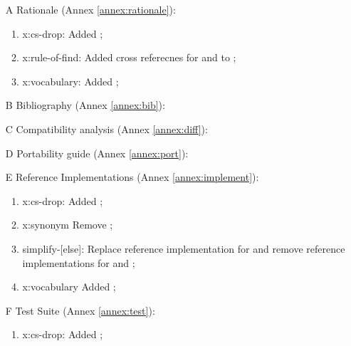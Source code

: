 \begin{itemize}
	\item[A] Rationale (Annex \ref{annex:rationale}):	%
		\begin{enumerate}
		\item \textsf{x:cs-drop}: Added ;
		\item \textsf{x:rule-of-find}: Added cross referecnes for
			 and  to
			;
		\item \textsf{x:vocabulary}: Added ;
		\end{enumerate}
	\item[B] Bibliography (Annex \ref{annex:bib}):		%
	\item[C] Compatibility analysis (Annex \ref{annex:diff}):	%
	\item[D] Portability guide (Annex \ref{annex:port}):		%
	\item[E] Reference Implementations (Annex \ref{annex:implement}): %
		\begin{enumerate}
		\item \textsf{x:cs-drop}: Added ;
		\item \textsf{x:synonym} Remove ; %
		\item \textsf{simplify-[else]}: Replace reference implementation for
			 and remove reference implementations
			for  and ;
		\item \textsf{x:vocabulary} Added ;
		\end{enumerate}
	\item[F] Test Suite (Annex \ref{annex:test}):	%
		\begin{enumerate}
		\item \textsf{x:cs-drop}: Added ;
		\end{enumerate}
	\end{itemize}

\endinput




